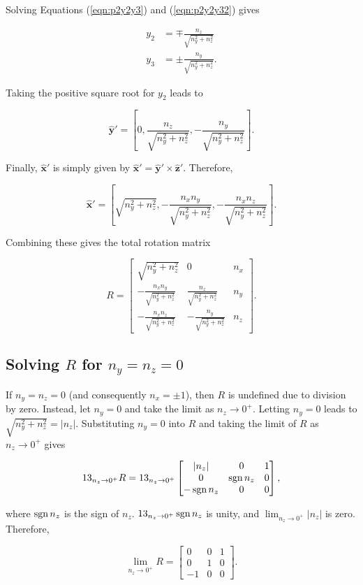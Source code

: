 \noindent Solving Equations (\ref{eqn:p2y2y3}) and (\ref{eqn:p2y2y32}) gives

\begin{align}
y_2 &= \mp \frac{n_z}{\sqrt{n_y^2+n_z^2}} \\
y_3 &= \pm \frac{n_y}{\sqrt{n_y^2+n_z^2}} \text{.}
\end{align}

\noindent Taking the positive square root for \(y_2\) leads to

\begin{equation}
\hat{\mathbf{y}}' = \left[ 0, \frac{n_z}{\sqrt{n_y^2+n_z^2}}, -\frac{n_y}{\sqrt{n_y^2+n_z^2}} \right] \text{.}
\end{equation}

\noindent Finally, \(\hat{\mathbf{x}}'\) is simply given by \(\hat{\mathbf{x}}' = \hat{\mathbf{y}}' \times \hat{\mathbf{z}}'\). Therefore,

\begin{equation}
\hat{\mathbf{x}}' = \left[ \sqrt{n_y^2+n_z^2}, -\frac{n_xn_y}{\sqrt{n_y^2+n_z^2}}, -\frac{n_xn_z}{\sqrt{n_y^2+n_z^2}} \right] \text{.}
\end{equation}

\noindent Combining these gives the total rotation matrix

\begin{equation}
R = \begin{bmatrix}
\sqrt{n_y^2+n_z^2} & 0 & n_x \\
-\frac{n_xn_y}{\sqrt{n_y^2+n_z^2}} & \frac{n_z}{\sqrt{n_y^2+n_z^2}} & n_y \\
-\frac{n_xn_z}{\sqrt{n_y^2+n_z^2}} & -\frac{n_y}{\sqrt{n_y^2+n_z^2}} & n_z \end{bmatrix} \text{.}
\end{equation}

\subsection*{Solving \texorpdfstring{\(R\) for \(n_y = n_z = 0\)}{R for ny = nz = 0}}

If \(n_y = n_z = 0\) (and consequently \(n_x = \pm1\)), then \(R\) is undefined due to division by zero. Instead, let \(n_y = 0\) and take the limit as \(n_z \to 0^+\). Letting \(n_y = 0\) leads to \(\sqrt{n_y^2+n_z^2} = \left|n_z\right|\). Substituting \(n_y = 0\) into \(R\) and taking the limit of \(R\) as \(n_z \to 0^+\) gives

\begin{equation}
13_{n_z \to 0^+} R = 13_{n_z \to 0^+} \begin{bmatrix}
\left|n_z\right| & 0 & 1 \\
0 & \operatorname{\text{sgn}} n_z & 0 \\
- \operatorname{\text{sgn}} n_z & 0 & 0
\end{bmatrix} \text{,}
\end{equation}

\noindent where \( \operatorname{\text{sgn}} n_z \) is the sign of \(n_z\). \(13_{n_z \to 0^+} \operatorname{\text{sgn}} n_z\) is unity, and \(\lim_{n_z \to 0^+} \left|n_z\right|\) is zero. Therefore,

\begin{equation}
\lim_{n_z \to 0^+} R = \begin{bmatrix}
0 & 0 & 1 \\
0 & 1 & 0 \\
-1 & 0 & 0
\end{bmatrix} \text{.}
\end{equation}